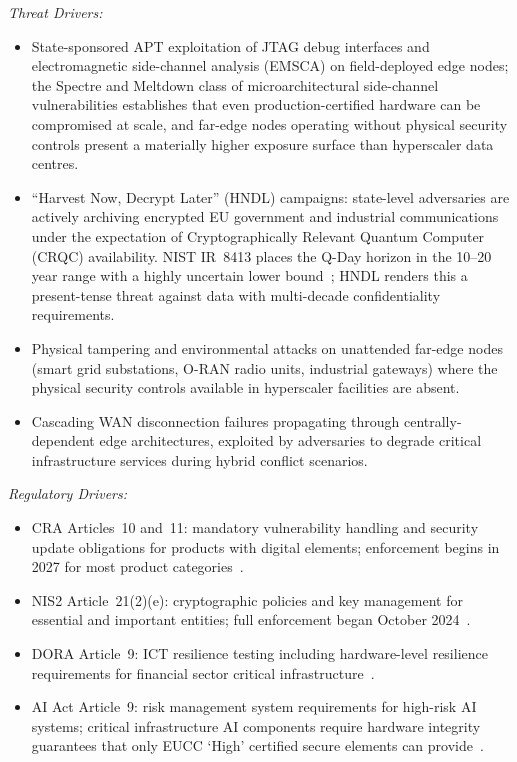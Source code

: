 \begin{enumerate}
\textit{Threat Drivers:}
\begin{itemize}
  \item State-sponsored APT exploitation of JTAG debug interfaces and electromagnetic
        side-channel analysis (EMSCA) on field-deployed edge nodes; the Spectre and Meltdown
        class of microarchitectural side-channel vulnerabilities establishes that even
        production-certified hardware can be compromised at scale, and far-edge nodes
        operating without physical security controls present a materially higher exposure
        surface than hyperscaler data centres.
  \item ``Harvest Now, Decrypt Later'' (HNDL) campaigns: state-level adversaries are
        actively archiving encrypted EU government and industrial communications under
        the expectation of Cryptographically Relevant Quantum Computer (CRQC)
        availability. NIST IR~8413 places the Q-Day horizon in the 10--20 year range
        with a highly uncertain lower bound~\cite{nistir8413}; HNDL renders this a
        present-tense threat against data with multi-decade confidentiality
        requirements.
  \item Physical tampering and environmental attacks on unattended far-edge nodes
        (smart grid substations, O-RAN radio units, industrial gateways) where the
        physical security controls available in hyperscaler facilities are absent.
  \item Cascading WAN disconnection failures propagating through centrally-dependent edge
        architectures, exploited by adversaries to degrade critical infrastructure
        services during hybrid conflict scenarios.
\end{itemize}

\textit{Regulatory Drivers:}
\begin{itemize}
  \item CRA Articles~10 and~11: mandatory vulnerability handling and security update
        obligations for products with digital elements; enforcement begins in 2027 for
        most product categories~\cite{cra}.
  \item NIS2 Article~21(2)(e): cryptographic policies and key management for essential
        and important entities; full enforcement began October 2024~\cite{nis2}.
  \item DORA Article~9: ICT resilience testing including hardware-level resilience
        requirements for financial sector critical infrastructure~\cite{dora}.
  \item AI Act Article~9: risk management system requirements for high-risk AI
        systems; critical infrastructure AI components require hardware integrity
        guarantees that only EUCC `High' certified secure elements can
        provide~\cite{aiact}.
\end{itemize}


\end{enumerate}
